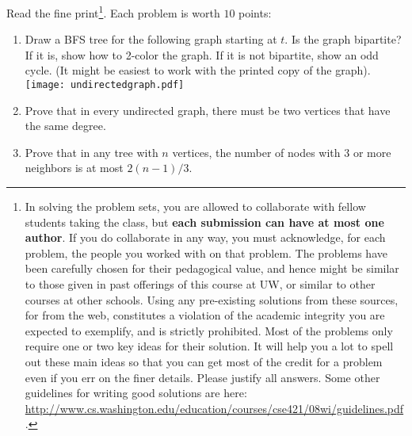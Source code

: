 \documentclass[11pt]{article}
\begin{document}



Read the fine print\footnote{In solving the problem sets, you are allowed to collaborate with fellow students taking the class, but \textbf{each submission can have at most one author}. If you do collaborate in any way, you must acknowledge, for each problem, the people you worked with on that problem.
The problems have been carefully chosen for their pedagogical value, and hence might be similar to those given in past offerings of this course at UW, or similar to other courses at other schools.  Using any pre-existing solutions from these sources, for from the web, constitutes a violation of the academic integrity you are expected to exemplify, and is strictly prohibited.
Most of the problems only require one or two key ideas for their solution.  It will help you a lot to spell out these main ideas so that you can get most of the credit for a problem even if you err on the finer details. Please justify all answers. Some other guidelines for writing good solutions are here: \url{http://www.cs.washington.edu/education/courses/cse421/08wi/guidelines.pdf}.}. Each problem is worth $10$ points:

\begin{enumerate}
\item Draw a BFS tree for the following graph starting at $t$. Is the graph bipartite? If it is, show how to 2-color the graph. If it is not bipartite, show an odd cycle. (It might be easiest to work with the printed copy of the graph). 
\texttt{[image: undirectedgraph.pdf]}
\item Prove that in every undirected graph, there must be two vertices that have the same degree. 
\item Prove that in any tree with $n$ vertices, the number of nodes with $3$ or more neighbors is at most $2(n-1)/3$. 
\end{enumerate}
\end{document}
